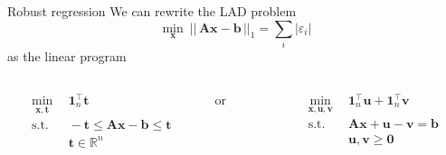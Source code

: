 \documentclass[16pt,aspectratio=169]{beamer}
\renewcommand{\vec}[1]{\ensuremath{\mathbf{#1}}}
\newcommand{\mat}[1]{\ensuremath{\vec{#1}}}
\newcommand{\tr}{\ensuremath{\intercal}}
\newcommand{\R}{\ensuremath{\mathbb{R}}}
\begin{document}
\begin{frame}{Robust regression}
    We can rewrite the LAD problem
    \[
        \min_{\vec{x}} \ \left|\left|\,\mat{A}\vec{x} - \vec{b}\,\right|\right|_{1}
        = \sum_{i} \left| \varepsilon_{i} \right|
    \]
    as the linear program
    \begin{columns}
        \begin{column}{0.475\textwidth}
            \begin{align*}
                \min_{\vec{x}, \vec{t}} \ &\ \vec{1}_{n}^{\tr} \vec{t} \\
                \text{s.t.}             \ &\ -\vec{t} \leq \mat{A} \vec{x} - \vec{b} \leq \vec{t} \\
                                          &\ \vec{t} \in \R^{n}
            \end{align*}
        \end{column}
        \begin{column}{0.05\textwidth}
            \centering%
            or
        \end{column}
        \begin{column}{0.475\textwidth}
            \begin{align*}
                \min_{\vec{x}, \vec{u}, \vec{v}} \ &\ \vec{1}_{n}^{\tr} \vec{u} + \vec{1}_{n}^{\tr} \vec{v} \\
                \text{s.t.}                      \ &\ \mat{A} \vec{x} + \vec{u} - \vec{v} = \vec{b} \\
                                                   &\ \vec{u}, \vec{v} \geq \vec{0}
            \end{align*}
        \end{column}
    \end{columns}
\end{frame}
\end{document}
